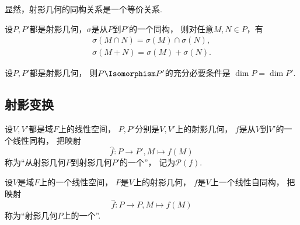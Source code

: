 显然，射影几何的同构关系是一个等价关系.

\begin{property}
设\(P,P'\)都是射影几何，\(\sigma\)是从\(P\)到\(P'\)的一个同构，
则对任意\(M,N \in P\)，有\begin{gather*}
	\sigma(M \cap N) = \sigma(M) \cap \sigma(N), \\
	\sigma(M + N) = \sigma(M) + \sigma(N).
\end{gather*}
\end{property}

\begin{theorem}%
设\(P,P'\)都是射影几何，
则\(P \Isomorphism P'\)的充分必要条件是
\(\dim P = \dim P'\).
\end{theorem}

\subsection{射影变换}
\begin{definition}
设\(V,V'\)都是域\(F\)上的线性空间，
\(P,P'\)分别是\(V,V'\)上的射影几何，
\(f\)是从\(V\)到\(V'\)的一个线性同构，
把映射\begin{equation*}
	\hat{f}\colon P \to P',
	M \mapsto f(M)
\end{equation*}
称为“从射影几何\(P\)到射影几何\(P'\)的一个”，
记为\(\mathcal{P}(f)\).
\end{definition}

\begin{definition}
设\(V\)是域\(F\)上的一个线性空间，
\(P\)是\(V\)上的射影几何，
\(f\)是\(V\)上一个线性自同构，
把映射\begin{equation*}
	\hat{f}\colon P \to P,
	M \mapsto f(M)
\end{equation*}
称为“射影几何\(P\)上的一个”.
\end{definition}


